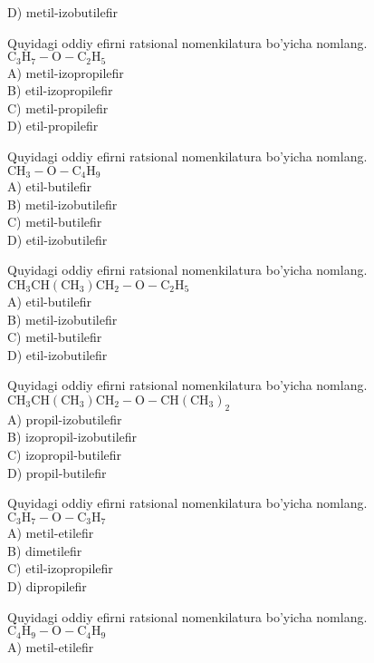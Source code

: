 D) metil-izobutilefir
  \item Quyidagi oddiy efirni ratsional nomenkilatura bo'yicha nomlang. $\mathrm{C}_{3} \mathrm{H}_{7}-\mathrm{O}-\mathrm{C}_{2} \mathrm{H}_{5}$\\
A) metil-izopropilefir\\
B) etil-izopropilefir\\
C) metil-propilefir\\
D) etil-propilefir
  \item Quyidagi oddiy efirni ratsional nomenkilatura bo'yicha nomlang. $\mathrm{CH}_{3}-\mathrm{O}-\mathrm{C}_{4} \mathrm{H}_{9}$\\
A) etil-butilefir\\
B) metil-izobutilefir\\
C) metil-butilefir\\
D) etil-izobutilefir
  \item Quyidagi oddiy efirni ratsional nomenkilatura bo'yicha nomlang.\\
$\mathrm{CH}_{3} \mathrm{CH}\left(\mathrm{CH}_{3}\right) \mathrm{CH}_{2}-\mathrm{O}-\mathrm{C}_{2} \mathrm{H}_{5}$\\
A) etil-butilefir\\
B) metil-izobutilefir\\
C) metil-butilefir\\
D) etil-izobutilefir
  \item Quyidagi oddiy efirni ratsional nomenkilatura bo'yicha nomlang.\\
$\mathrm{CH}_{3} \mathrm{CH}\left(\mathrm{CH}_{3}\right) \mathrm{CH}_{2}-\mathrm{O}-\mathrm{CH}\left(\mathrm{CH}_{3}\right)_{2}$\\
A) propil-izobutilefir\\
B) izopropil-izobutilefir\\
C) izopropil-butilefir\\
D) propil-butilefir
  \item Quyidagi oddiy efirni ratsional nomenkilatura bo'yicha nomlang. $\mathrm{C}_{3} \mathrm{H}_{7}-\mathrm{O}-\mathrm{C}_{3} \mathrm{H}_{7}$\\
A) metil-etilefir\\
B) dimetilefir\\
C) etil-izopropilefir\\
D) dipropilefir
  \item Quyidagi oddiy efirni ratsional nomenkilatura bo'yicha nomlang. $\mathrm{C}_{4} \mathrm{H}_{9}-\mathrm{O}-\mathrm{C}_{4} \mathrm{H}_{9}$\\
A) metil-etilefir\\
